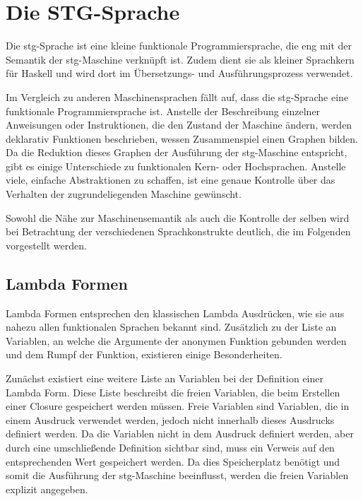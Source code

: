 
\chapter{Die STG-Sprache}\label{chap:stg}

Die \gls{stg}-Sprache ist eine kleine funktionale Programmiersprache, die eng mit der Semantik der \gls{stg}-Maschine verknüpft ist.
Zudem dient sie als kleiner Sprachkern für Haskell und wird dort im Übersetzungs- und Ausführungsprozess verwendet.

Im Vergleich zu anderen Maschinensprachen fällt auf, dass die \gls{stg}-Sprache eine funktionale Programmiersprache ist.
Anstelle der Beschreibung einzelner Anweisungen oder Instruktionen, die den Zustand der Maschine ändern, werden deklarativ Funktionen beschrieben, wessen Zusammenspiel einen Graphen bilden.
Da die Reduktion dieses Graphen der Ausführung der \gls{stg}-Maschine entspricht, gibt es einige Unterschiede zu funktionalen Kern- oder Hochsprachen.
Anstelle viele, einfache Abstraktionen zu schaffen, ist eine genaue Kontrolle über das Verhalten der zugrundeliegenden Maschine gewünscht.

Sowohl die Nähe zur Maschinensemantik als auch die Kontrolle der selben wird bei Betrachtung der verschiedenen Sprachkonstrukte deutlich, die im Folgenden vorgestellt werden.



\section{Lambda Formen}

Lambda Formen entsprechen den klassischen Lambda Ausdrücken, wie sie aus nahezu allen funktionalen Sprachen bekannt sind.
Zusätzlich zu der Liste an Variablen, an welche die Argumente der anonymen Funktion gebunden werden und dem Rumpf der Funktion, existieren einige Besonderheiten.

Zunächst existiert eine weitere Liste an Variablen bei der Definition einer Lambda Form.
Diese Liste beschreibt die freien Variablen, die beim Erstellen einer Closure gespeichert werden müssen.
Freie Variablen sind Variablen, die in einem Ausdruck verwendet werden, jedoch nicht innerhalb dieses Ausdrucks definiert werden.
Da die Variablen nicht in dem Ausdruck definiert werden, aber durch eine umschließende Definition sichtbar sind, muss ein Verweis auf den entsprechenden Wert gespeichert werden.
Da dies Speicherplatz benötigt und somit die Ausführung der \gls{stg}-Maschine beeinflusst, werden die freien Variablen explizit angegeben.

